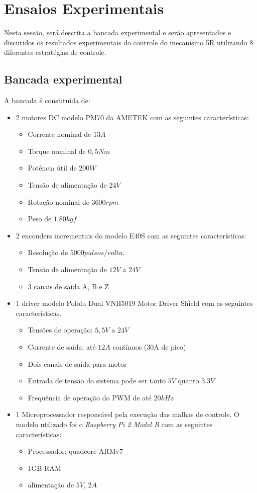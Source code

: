 \documentclass[]{politex}
\begin{document}
\section{Ensaios Experimentais}

Nesta sessão, será descrita a bancada experimental e serão apresentados e discutidos os resultados experimentais do controle do mecanismo 5R utilizando 8 diferentes estratégias de controle.

\subsection{Bancada experimental}

A bancada é constituída de:

\begin{itemize}
\item 2 motores DC modelo PM70 da AMETEK com as seguintes características:
\begin{itemize}
\item Corrente nominal de $13A$ 
\item Torque nominal de $0,5Nm$
\item Potência útil de $200W$
\item Tensão de alimentação de $24V$
\item Rotação nominal de $3600 rpm$
\item Peso de $1.80 kgf$ 
\end{itemize}
\item  2 enconders incrementais do modelo E40S com as seguintes características:
\begin{itemize}
\item Resolução de $5000 pulsos/volta$.
\item Tensão de alimentação de $12V$ a $24V$
\item 3 canais de saída A, B e Z
\end{itemize}
\item 1 driver modelo Pololu Dual VNH5019 Motor Driver Shield com as seguintes características.
\begin{itemize}
\item Tensões de operação: $5,5V$ a $24V$
\item Corrente de saída: até $12A$ contínuos (30A de pico)
\item Dois canais de saída para motor
\item Entrada de tensão do sistema pode ser tanto $5V$ quanto $3.3V$
\item Frequência de operação do PWM de até $20kHz$
\end{itemize}
\item 1 Microprocessador responsável pela execução das malhas de controle. O modelo utilizado foi o \textit{Raspberry Pi 2 Model B} com as seguintes características:
\begin{itemize}
\item Processador: quadcore ARMv7
\item 1GB RAM
\item alimentação de $5V$, $2A$
\end{itemize}
\end{itemize}
\end{document}
